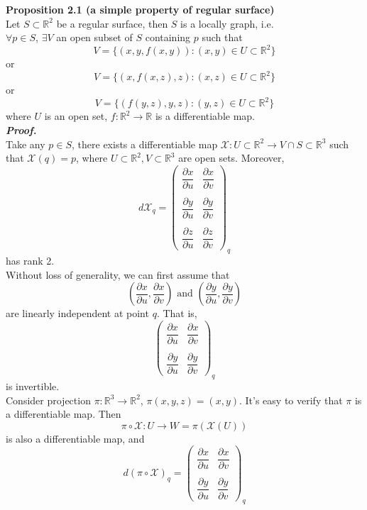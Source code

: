 \documentclass{article}
\begin{document}
\par
\textbf{Proposition 2.1 (a simple property of regular surface)}\\
Let $S \subset \mathbb{R}^2$ be a regular surface, then $S$ is a locally graph, i.e.\\
$\forall p \in S$, $\exists V$ an open subset of $S$ containing $p$ such that
$$
    V = \{(x,y,f(x,y)): (x,y) \in U \subset \mathbb{R}^2\}
$$
or
$$
    V = \{(x,f(x,z),z): (x,z) \in U \subset \mathbb{R}^2\}
$$
or
$$
    V = \{(f(y,z),y,z): (y,z) \in U \subset \mathbb{R}^2\}
$$
where $U$ is an open set, $f: \mathbb{R}^2 \to \mathbb{R}$ is a differentiable map.\\
\textbf{\textit{Proof.}}\\
Take any $p \in S$, there exists a differentiable map $\mathcal{X}: U \subset \mathbb{R}^2 \to V \cap S \subset \mathbb{R}^3$
such that $\mathcal{X}(q)=p$, where $U \subset \mathbb{R}^2,V \subset \mathbb{R}^3$ are open sets. Moreover,
$$
    d\mathcal{X}_q = 
    \left(\begin{array}{cc} 
        \dfrac{\partial x}{\partial u} & \dfrac{\partial x}{\partial v} \\\\
        \dfrac{\partial y}{\partial u} & \dfrac{\partial y}{\partial v} \\\\
        \dfrac{\partial z}{\partial u} & \dfrac{\partial z}{\partial v}
    \end{array}\right)_q
$$
has rank 2.\\
Without loss of generality, we can first assume that
$$
    (\dfrac{\partial x}{\partial u}, \dfrac{\partial x}{\partial v}) \text{ and } (\dfrac{\partial y}{\partial u}, \dfrac{\partial y}{\partial v})
$$
are linearly independent at point $q$. That is,
$$
\left(\begin{array}{cc} 
    \dfrac{\partial x}{\partial u} & \dfrac{\partial x}{\partial v} \\\\
    \dfrac{\partial y}{\partial u} & \dfrac{\partial y}{\partial v}
\end{array}\right)_q
$$
is invertible.\\
Consider projection $\pi: \mathbb{R}^3 \to \mathbb{R}^2$, $\pi (x,y,z) = (x,y)$. It's easy to
verify that $\pi$ is a differentiable map. Then
$$
    \pi \circ \mathcal{X}: U \to W=\pi(\mathcal{X}(U))
$$
is also a differentiable map, and
$$
    d(\pi \circ \mathcal{X})_q = 
    \left(\begin{array}{cc} 
        \dfrac{\partial x}{\partial u} & \dfrac{\partial x}{\partial v} \\\\
        \dfrac{\partial y}{\partial u} & \dfrac{\partial y}{\partial v}
    \end{array}\right)_q
$$
\end{document}
